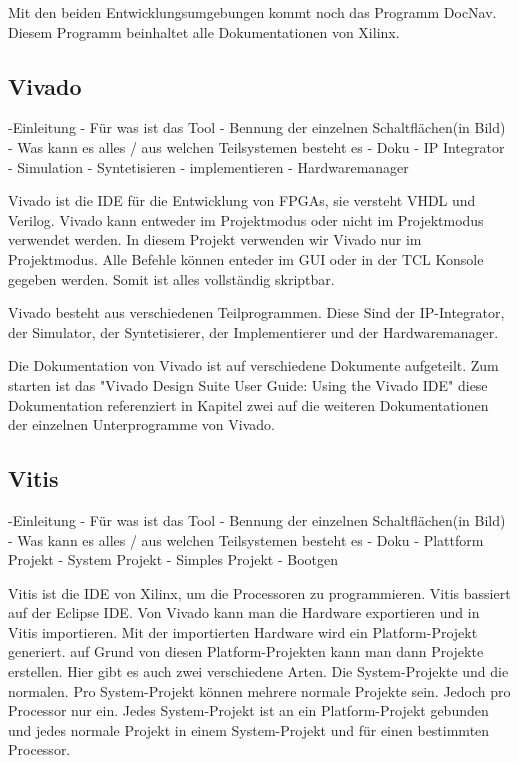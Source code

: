 \documentclass{article}
\begin{document}
Mit den beiden Entwicklungsumgebungen kommt noch das Programm DocNav. Diesem Programm beinhaltet alle Dokumentationen von Xilinx.
\subsection{Vivado}
-Einleitung
    - Für was ist das Tool
    - Bennung der einzelnen Schaltflächen(in Bild)
    - Was kann es alles / aus welchen Teilsystemen besteht es
    - Doku
- IP Integrator
- Simulation
- Syntetisieren
- implementieren
- Hardwaremanager

Vivado ist die IDE für die Entwicklung von FPGAs, sie versteht VHDL und Verilog. Vivado kann entweder im Projektmodus oder nicht im Projektmodus verwendet werden. In diesem Projekt verwenden wir Vivado nur im Projektmodus. Alle Befehle können enteder im GUI oder in der TCL Konsole gegeben werden. Somit ist alles vollständig skriptbar. 

Vivado besteht aus verschiedenen Teilprogrammen. Diese Sind der IP-Integrator, der Simulator, der Syntetisierer, der Implementierer und der Hardwaremanager.

Die Dokumentation von Vivado ist auf verschiedene Dokumente aufgeteilt. Zum starten ist das "Vivado Design Suite User Guide: Using the Vivado IDE" diese Dokumentation referenziert in Kapitel zwei auf die weiteren Dokumentationen der einzelnen Unterprogramme von Vivado.


\subsection{Vitis}
-Einleitung
    - Für was ist das Tool
    - Bennung der einzelnen Schaltflächen(in Bild)
    - Was kann es alles / aus welchen Teilsystemen besteht es
    - Doku
- Plattform Projekt
- System Projekt
- Simples Projekt
- Bootgen

Vitis ist die IDE von Xilinx, um die Processoren zu programmieren. Vitis bassiert auf der Eclipse IDE. 
Von Vivado kann man die Hardware exportieren und in Vitis importieren. Mit der importierten Hardware wird ein Platform-Projekt generiert. auf Grund von diesen Platform-Projekten kann man dann Projekte erstellen. Hier gibt es auch zwei verschiedene Arten. Die System-Projekte und die normalen. Pro System-Projekt können mehrere normale Projekte sein. Jedoch pro Processor nur ein. Jedes System-Projekt ist an ein Platform-Projekt gebunden und jedes normale Projekt in einem System-Projekt und für einen bestimmten Processor.
\end{document}
